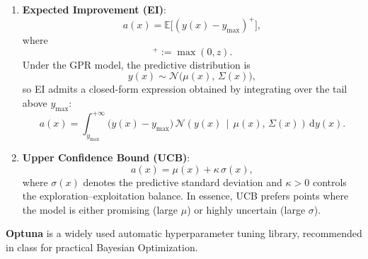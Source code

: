 \documentclass[../main]{subfiles}
\begin{document}
\begin{enumerate}
    \item \textbf{Expected Improvement (EI)}:
    \begin{equation}
        a(x) = \mathbb{E}\big[(y(x) - y_{\max})^{+}\big],
    \end{equation}
    where
    \begin{equation}
        [z]^{+} := \max(0, z).
    \end{equation}
    Under the GPR model, the predictive distribution is
    \begin{equation}
        y(x) \sim \mathcal{N}\big(\mu(x),\, \Sigma(x)\big),
    \end{equation}
    so EI admits a closed-form expression obtained by integrating over the
    tail above $y_{\max}$:
    \begin{equation}
        a(x)=\int_{y_{\max}}^{+\infty} \big(y(x)-y_{\max}\big)\,
        \mathcal{N}\!\left(y(x)\,\middle|\,\mu(x),\,\Sigma(x)\right)\,
        \mathrm{d}y(x).
    \end{equation}

    \item \textbf{Upper Confidence Bound (UCB)}:
    \begin{equation}
        a(x)=\mu(x) + \kappa\,\sigma(x),
    \end{equation}
    where $\sigma(x)$ denotes the predictive standard deviation and
    $\kappa>0$ controls the exploration–exploitation balance.
    In essence, UCB prefers points where the model is either promising
    (large $\mu$) or highly uncertain (large $\sigma$).
\end{enumerate}

\begin{remark}
    \textbf{Optuna} is a widely used automatic hyperparameter tuning library,
    recommended in class for practical Bayesian Optimization.
\end{remark}
\end{document}
